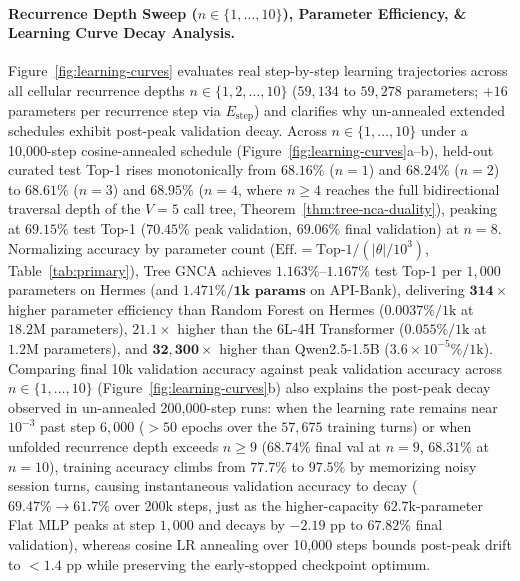 \documentclass[10pt,twocolumn,letterpaper]{article}
\begin{document}
\paragraph{Recurrence Depth Sweep ($n \in \{1, \dots, 10\}$), Parameter Efficiency, \& Learning Curve Decay Analysis.}
Figure~\ref{fig:learning-curves} evaluates real step-by-step learning trajectories across all cellular recurrence depths $n \in \{1, 2, \dots, 10\}$ ($59{,}134$ to $59{,}278$ parameters; $+16$ parameters per recurrence step via $E_{\text{step}}$) and clarifies why un-annealed extended schedules exhibit post-peak validation decay. Across $n \in \{1, \dots, 10\}$ under a 10{,}000-step cosine-annealed schedule (Figure~\ref{fig:learning-curves}a--b), held-out curated test Top-1 rises monotonically from $68.16\%$ ($n=1$) and $68.24\%$ ($n=2$) to $68.61\%$ ($n=3$) and $\mathbf{68.95\%}$ ($n=4$, where $n \ge 4$ reaches the full bidirectional traversal depth of the $V=5$ call tree, Theorem~\ref{thm:tree-nca-duality}), peaking at $\mathbf{69.15\%}$ test Top-1 ($70.45\%$ peak validation, $69.06\%$ final validation) at $n=8$. Normalizing accuracy by parameter count ($\text{Eff.} = \text{Top-1} / (|\theta|/10^3)$, Table~\ref{tab:primary}), Tree GNCA achieves $\mathbf{1.163\%}$--$\mathbf{1.167\%}$ test Top-1 per $1{,}000$ parameters on Hermes (and $\mathbf{1.471\% / \text{1k params}}$ on API-Bank), delivering $\mathbf{314\times}$ higher parameter efficiency than Random Forest on Hermes ($0.0037\% / \text{1k}$ at $18.2\text{M}$ parameters), $\mathbf{21.1\times}$ higher than the 6L-4H Transformer ($0.055\% / \text{1k}$ at $1.2\text{M}$ parameters), and $\mathbf{32{,}300\times}$ higher than Qwen2.5-1.5B ($3.6 \times 10^{-5}\% / \text{1k}$). Comparing final 10k validation accuracy against peak validation accuracy across $n \in \{1, \dots, 10\}$ (Figure~\ref{fig:learning-curves}b) also explains the post-peak decay observed in un-annealed 200{,}000-step runs: when the learning rate remains near $10^{-3}$ past step $6{,}000$ ($>50$ epochs over the $57{,}675$ training turns) or when unfolded recurrence depth exceeds $n \ge 9$ ($68.74\%$ final val at $n=9$, $68.31\%$ at $n=10$), training accuracy climbs from $77.7\%$ to $97.5\%$ by memorizing noisy session turns, causing instantaneous validation accuracy to decay ($69.47\% \to 61.7\%$ over 200k steps, just as the higher-capacity $62.7\text{k}$-parameter Flat MLP peaks at step $1{,}000$ and decays by $-2.19\text{ pp}$ to $67.82\%$ final validation), whereas cosine LR annealing over 10{,}000 steps bounds post-peak drift to $<1.4\text{ pp}$ while preserving the early-stopped checkpoint optimum.
\end{document}
